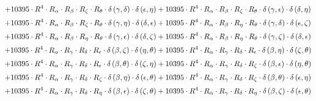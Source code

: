 \begin{subequations}
\begin{gather}
 \\[0.2em] \notag 		 + 10395 \cdot R^{4} \cdot R_{\alpha{}} \cdot R_{\beta{}} \cdot R_{\zeta{}} \cdot R_{\theta{}} \cdot \delta{}\left(\gamma{}, \delta{}\right) \cdot \delta{}\left(\epsilon{}, \eta{}\right)+ 10395 \cdot R^{4} \cdot R_{\alpha{}} \cdot R_{\beta{}} \cdot R_{\zeta{}} \cdot R_{\theta{}} \cdot \delta{}\left(\gamma{}, \epsilon{}\right) \cdot \delta{}\left(\delta{}, \eta{}\right) 
 \\[0.2em] \notag 		 + 10395 \cdot R^{4} \cdot R_{\alpha{}} \cdot R_{\beta{}} \cdot R_{\zeta{}} \cdot R_{\theta{}} \cdot \delta{}\left(\gamma{}, \eta{}\right) \cdot \delta{}\left(\delta{}, \epsilon{}\right)+ 10395 \cdot R^{4} \cdot R_{\alpha{}} \cdot R_{\beta{}} \cdot R_{\eta{}} \cdot R_{\theta{}} \cdot \delta{}\left(\gamma{}, \delta{}\right) \cdot \delta{}\left(\epsilon{}, \zeta{}\right) 
 \\[0.2em] \notag 		 + 10395 \cdot R^{4} \cdot R_{\alpha{}} \cdot R_{\beta{}} \cdot R_{\eta{}} \cdot R_{\theta{}} \cdot \delta{}\left(\gamma{}, \epsilon{}\right) \cdot \delta{}\left(\delta{}, \zeta{}\right)+ 10395 \cdot R^{4} \cdot R_{\alpha{}} \cdot R_{\beta{}} \cdot R_{\eta{}} \cdot R_{\theta{}} \cdot \delta{}\left(\gamma{}, \zeta{}\right) \cdot \delta{}\left(\delta{}, \epsilon{}\right) 
 \\[0.2em] \notag 		 + 10395 \cdot R^{4} \cdot R_{\alpha{}} \cdot R_{\gamma{}} \cdot R_{\delta{}} \cdot R_{\epsilon{}} \cdot \delta{}\left(\beta{}, \zeta{}\right) \cdot \delta{}\left(\eta{}, \theta{}\right)+ 10395 \cdot R^{4} \cdot R_{\alpha{}} \cdot R_{\gamma{}} \cdot R_{\delta{}} \cdot R_{\epsilon{}} \cdot \delta{}\left(\beta{}, \eta{}\right) \cdot \delta{}\left(\zeta{}, \theta{}\right) 
 \\[0.2em] \notag 		 + 10395 \cdot R^{4} \cdot R_{\alpha{}} \cdot R_{\gamma{}} \cdot R_{\delta{}} \cdot R_{\epsilon{}} \cdot \delta{}\left(\beta{}, \theta{}\right) \cdot \delta{}\left(\zeta{}, \eta{}\right)+ 10395 \cdot R^{4} \cdot R_{\alpha{}} \cdot R_{\gamma{}} \cdot R_{\delta{}} \cdot R_{\zeta{}} \cdot \delta{}\left(\beta{}, \epsilon{}\right) \cdot \delta{}\left(\eta{}, \theta{}\right) 
 \\[0.2em] \notag 		 + 10395 \cdot R^{4} \cdot R_{\alpha{}} \cdot R_{\gamma{}} \cdot R_{\delta{}} \cdot R_{\zeta{}} \cdot \delta{}\left(\beta{}, \eta{}\right) \cdot \delta{}\left(\epsilon{}, \theta{}\right)+ 10395 \cdot R^{4} \cdot R_{\alpha{}} \cdot R_{\gamma{}} \cdot R_{\delta{}} \cdot R_{\zeta{}} \cdot \delta{}\left(\beta{}, \theta{}\right) \cdot \delta{}\left(\epsilon{}, \eta{}\right) 
 \\[0.2em] \notag 		 + 10395 \cdot R^{4} \cdot R_{\alpha{}} \cdot R_{\gamma{}} \cdot R_{\delta{}} \cdot R_{\eta{}} \cdot \delta{}\left(\beta{}, \epsilon{}\right) \cdot \delta{}\left(\zeta{}, \theta{}\right)+ 10395 \cdot R^{4} \cdot R_{\alpha{}} \cdot R_{\gamma{}} \cdot R_{\delta{}} \cdot R_{\eta{}} \cdot \delta{}\left(\beta{}, \zeta{}\right) \cdot \delta{}\left(\epsilon{}, \theta{}\right) 

\end{gather}
\end{subequations}
